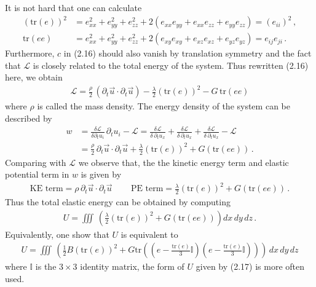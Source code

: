 \documentclass[11pt, onesided]{book}
\theoremstyle{break}
\theoremstyle{break}
\newcommand{\pd}{\partial}
\begin{document}
It is not hard that one can calculate
\begin{align*}
(\text{tr}(e))^2 &= e_{xx}^2 + e_{yy}^2 + e_{zz}^2 + 2\left( e_{xx}e_{yy} + e_{xx}e_{zz} + e_{yy}e_{zz}\right) = (e_{ii})^2\,,\\
\text{tr}(ee)&= e_{xx}^2 + e_{yy}^2 + e_{zz}^2 +2\left( e_{xy}e_{xy} + e_{xz}e_{xz} + e_{yz}e_{yz}\right) = e_{ij}e_{ji}\,.
\end{align*}
Furthermore, $c$ in (2.16) should also vanish by translation symmetry and the fact that $\mathcal{L}$ is closely related to the total energy of the system. Thus rewritten (2.16) here, we obtain
\begin{align*}
\mathcal{L} = \frac{\rho}{2}\, (\pd_t \vec{u}\cdot \pd_t \vec{u}) - \frac{\lambda}{2}\left( \text{tr}(e)\right)^2 - G\, \text{tr}(ee)
\end{align*}
where $\rho$ is called the mass density. The energy density of the system can be described by
\begin{align*}
w &= \frac{\delta \mathcal{L}}{\delta \pd_tu_i} \, \pd_t u_i  - \mathcal{L}= \frac{\delta \mathcal{L}}{\delta \, \pd_t u_x}+\frac{\delta \mathcal{L}}{\delta \, \pd_t u_x}+\frac{\delta \mathcal{L}}{\delta \, \pd_t u_x} - \mathcal{L} \\
&= \frac{\rho}{2} \, \pd_t\vec{u}\cdot \pd_t \vec{u} + \frac{\lambda}{2}\left( \text{tr}(e)\right)^2 + G(\text{tr}(ee))\,. 
\end{align*}
Comparing with $\mathcal{L}$ we observe that, the the kinetic energy term and elastic potential term in $w$ is given by
\begin{align*}
\text{KE term} =  \rho \, \pd_t\vec{u}\cdot \pd_t \vec{u} \,\qquad \text{PE term} = \frac{\lambda}{2}\left( \text{tr}(e)\right)^2 + G(\text{tr}(ee))\,.
\end{align*}
Thus the total elastic energy can be obtained by computing
\begin{align*}
U = \iiint \,\left( \frac{\lambda}{2}\left( \text{tr}(e)\right)^2 + G(\text{tr}(ee))\right) dx\,dy\, dz\,.
\end{align*}
Equivalently, one show that $U$ is equivalent to 
\begin{align}
U = \iiint\, \left(\frac{1}{2}B(\text{tr}(e))^2 + G\text{tr}\left(\left(e-\frac{\text{tr}(e)}{3}\mathbb{I}\right)\left(e-\frac{\text{tr}(e)}{3}\mathbb{I}\right)  \right)  \right)  \, dx\,dy\,dz
\end{align}
where $\mathbb{I}$ is the $3\times 3$ identity matrix, the form of $U$ given by (2.17) is more often used.\\
\end{document}
